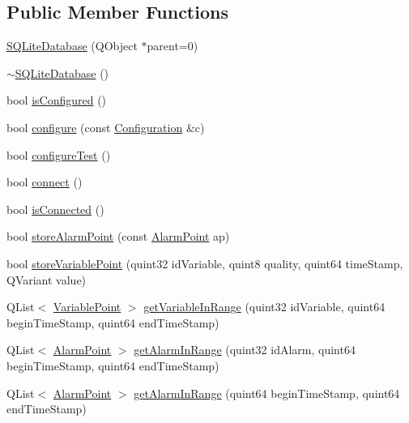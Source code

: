 \subsection*{Public Member Functions}
\begin{DoxyCompactItemize}
\item 
\hyperlink{class_s_q_lite_database_af1652162395df728e2d37a54f9438392}{S\+Q\+Lite\+Database} (Q\+Object $\ast$parent=0)
\item 
\hyperlink{class_s_q_lite_database_a74d672abce489b8db3f6627c8cfc5c99}{$\sim$\+S\+Q\+Lite\+Database} ()
\item 
bool \hyperlink{class_s_q_lite_database_ae9258c0507e015357e8fb4365f2f480f}{is\+Configured} ()
\item 
bool \hyperlink{class_s_q_lite_database_ae3789b5cd2020d8c22238b1e49d29f77}{configure} (const \hyperlink{class_configuration}{Configuration} \&c)
\item 
bool \hyperlink{class_s_q_lite_database_abb72ffed11b3c771aca886b425c041c4}{configure\+Test} ()
\item 
bool \hyperlink{class_s_q_lite_database_a14c0bc243e5c688d1806a2bdc9ba48ca}{connect} ()
\item 
bool \hyperlink{class_s_q_lite_database_a57e70bc6ae29d2247c3b5572e2f078ef}{is\+Connected} ()
\item 
bool \hyperlink{class_s_q_lite_database_a90e329d2353e9b6c16c0de527bf2832d}{store\+Alarm\+Point} (const \hyperlink{class_alarm_point}{Alarm\+Point} ap)
\item 
bool \hyperlink{class_s_q_lite_database_aed2925c70c2e3b3444991dd62dfeaabf}{store\+Variable\+Point} (quint32 id\+Variable, quint8 quality, quint64 time\+Stamp, Q\+Variant value)
\item 
Q\+List$<$ \hyperlink{class_variable_point}{Variable\+Point} $>$ \hyperlink{class_s_q_lite_database_a58aec2c2a9a214e5ee8c5459250d896e}{get\+Variable\+In\+Range} (quint32 id\+Variable, quint64 begin\+Time\+Stamp, quint64 end\+Time\+Stamp)
\item 
Q\+List$<$ \hyperlink{class_alarm_point}{Alarm\+Point} $>$ \hyperlink{class_s_q_lite_database_af0d350ccb3ccc805d333df5f59273566}{get\+Alarm\+In\+Range} (quint32 id\+Alarm, quint64 begin\+Time\+Stamp, quint64 end\+Time\+Stamp)
\item 
Q\+List$<$ \hyperlink{class_alarm_point}{Alarm\+Point} $>$ \hyperlink{class_s_q_lite_database_a5e7cf50d5ab276e40208ccd99252d0af}{get\+Alarm\+In\+Range} (quint64 begin\+Time\+Stamp, quint64 end\+Time\+Stamp)
\item 

\end{DoxyCompactItemize}
